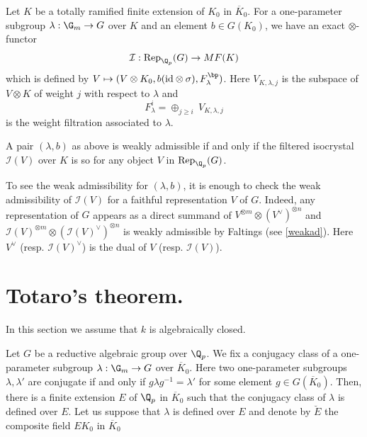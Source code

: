 \begin{apppara}
 Let $K$ be a totally ramified finite extension
 of $K_0$ in $\overline{K}_0$.
 For a one-parameter subgroup $\lambda : \G_m \rightarrow G$
 over $K$ and an element $b \in G(K_0)$,
 we have an exact $\otimes$-functor
 $$
    {\mathcal I} : \mathrm{Rep}_{\Q_p}(G)
               \rightarrow MF(K)
 $$
 which is defined by $V \mapsto
 (V \otimes K_0, b(\mathrm{id} \otimes \sigma), F^{\bp}_\lambda)$.
 Here $V_{K, \lambda, j}$ is the subspace of $V \otimes K$
 of weight $j$ with respect to $\lambda$ and
 $$
    F^i_\lambda = \displaystyle{\mathop{\oplus}_{j \geq i}}\ V_{K, \lambda, j}
 $$
 is the weight filtration associated to $\lambda$.
\end{apppara}

\begin{appdfn}
 A pair $(\lambda, b)$ as above is weakly admissible
 if and only if
 the filtered isocrystal ${\mathcal I}(V)$ over $K$ is so for any
 object $V$ in $\mathrm{Rep}_{\Q_p}(G)$.
\end{appdfn}
To see the weak admissibility for $(\lambda, b)$, it is enough to check
the weak admissibility of ${\mathcal I}(V)$ for a faithful
representation $V$ of $G$.  Indeed, any representation of $G$ appears as
a direct summand of $V^{\otimes m} \otimes (V^\vee)^{\otimes n}$ and
${\mathcal I}(V)^{\otimes m} \otimes ({\mathcal I}(V)^\vee)^{\otimes n}$
is weakly admissible by Faltings (see \ref{weakad}).  Here $V^\vee$
(resp. ${\mathcal I}(V)^\vee$) is the dual of $V$ (resp.  ${\mathcal
I}(V)$).

\section{Totaro's theorem.}

In this section we assume that $k$ is algebraically closed.

\begin{apppara}
 Let $G$ be a reductive algebraic group over $\Q_p$.
 We fix a conjugacy class of a one-parameter subgroup
 $\lambda : \G_m \rightarrow G$ over $\overline{K}_0$.
 Here two one-parameter subgroups $\lambda, \lambda'$ are conjugate
 if and only if $g \lambda g^{-1} = \lambda'$ for some element $g \in
 G(\overline{K}_0)$.
 Then, there is a finite extension $E$ of $\Q_p$ in $\overline{K}_0$
 such that the conjugacy class of $\lambda$ is defined over $E$.
 Let us suppose that $\lambda$ is defined over $E$ and denote by
 $\breve{E}$ the composite field $EK_0$ in $\overline{K}_0$
\end{apppara}

